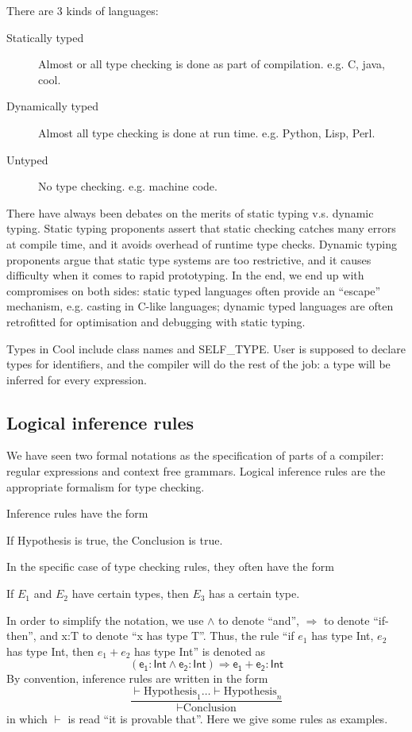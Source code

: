 There are 3 kinds of languages: 
\begin{description}
\item[Statically typed]Almost or all type checking is done as part of compilation. e.g. C, java, cool.
\item[Dynamically typed]Almost all type checking is done at run time. e.g. Python, Lisp, Perl.
\item[Untyped]No type checking. e.g. machine code.
\end{description}
There have always been debates on the merits of static typing v.s. dynamic typing. Static typing proponents assert that static checking catches many errors at compile time, and it avoids overhead of runtime type checks. Dynamic typing proponents argue that static type systems are too restrictive, and it causes difficulty when it comes to rapid prototyping. In the end, we end up with compromises on both sides: static typed languages often provide an ``escape'' mechanism, e.g. casting in C-like languages; dynamic typed languages are often retrofitted for optimisation and debugging with static typing. 

Types in Cool include class names and SELF\_TYPE. User is supposed to declare types for identifiers, and the compiler will do the rest of the job: a type will be inferred for every expression. 
\subsection{Logical inference rules}
We have seen two formal notations as the specification of parts of a compiler: regular expressions and context free grammars. Logical inference rules are the appropriate formalism for type checking. 

Inference rules have the form
\begin{center}
If Hypothesis is true, the Conclusion is true. 
\end{center}
In the specific case of type checking rules, they often have the form
\begin{center}
If $E_1$ and $E_2$ have certain types, then $E_3$ has a certain type. 
\end{center}
In order to simplify the notation, we use $\land$ to denote ``and'', $\Rightarrow$ to denote ``if-then'', and x:T to denote ``x has type T''. Thus, the rule ``if $e_1$ has type Int, $e_2$ has type Int, then $e_1+e_2$ has type Int'' is denoted as 
\begin{equation*}
\mathsf{(e_1:Int\land e_2:Int)\Rightarrow e_1+e_2:Int}
\end{equation*}
By convention, inference rules are written in the form
\begin{equation*}
\frac{\vdash\text{Hypothesis}_1\dots\vdash\text{Hypothesis}_n}{\vdash\text{Conclusion}}
\end{equation*}
in which $\vdash$ is read ``it is provable that''. Here we give some rules as examples.

